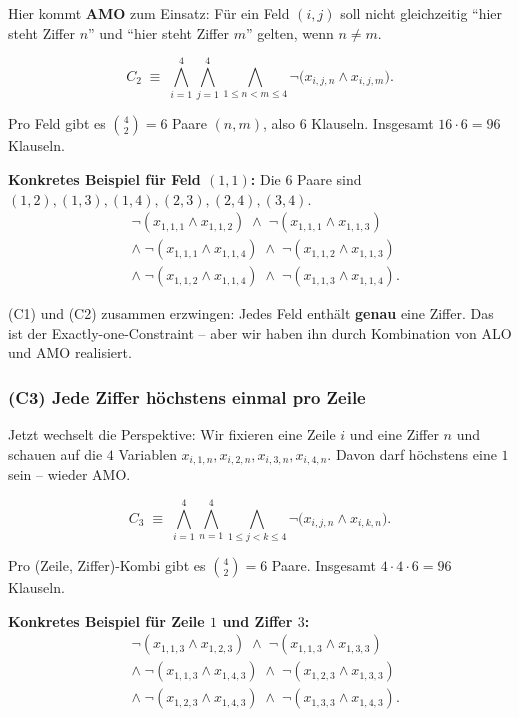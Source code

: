 \documentclass[a4paper,12pt]{article}
\begin{document}
Hier kommt \textbf{AMO} zum Einsatz: F\"ur ein Feld $(i,j)$ soll nicht
gleichzeitig "`hier steht Ziffer $n$"' und "`hier steht Ziffer $m$"'
gelten, wenn $n \ne m$.

\[
C_2 \;\equiv\;
\bigwedge_{i=1}^{4} \bigwedge_{j=1}^{4}
\bigwedge_{1 \le n < m \le 4}
\neg\bigl(x_{i,j,n} \wedge x_{i,j,m}\bigr).
\]

Pro Feld gibt es $\binom{4}{2} = 6$ Paare $(n,m)$, also $6$ Klauseln.
Insgesamt $16 \cdot 6 = 96$ Klauseln.

\textbf{Konkretes Beispiel f\"ur Feld $(1,1)$:} Die $6$ Paare sind
$(1,2), (1,3), (1,4), (2,3), (2,4), (3,4)$.
\begin{align*}
& \neg(x_{1,1,1} \wedge x_{1,1,2}) \;\wedge\; \neg(x_{1,1,1} \wedge x_{1,1,3}) \\
& \wedge\; \neg(x_{1,1,1} \wedge x_{1,1,4}) \;\wedge\; \neg(x_{1,1,2} \wedge x_{1,1,3}) \\
& \wedge\; \neg(x_{1,1,2} \wedge x_{1,1,4}) \;\wedge\; \neg(x_{1,1,3} \wedge x_{1,1,4}).
\end{align*}

\begin{merkbox}
(C1) und (C2) zusammen erzwingen: Jedes Feld enth\"alt \textbf{genau}
eine Ziffer. Das ist der Exactly-one-Constraint -- aber wir haben ihn
durch Kombination von ALO und AMO realisiert.
\end{merkbox}

\subsubsection*{(C3) Jede Ziffer h\"ochstens einmal pro Zeile}

Jetzt wechselt die Perspektive: Wir fixieren eine Zeile $i$ und eine
Ziffer $n$ und schauen auf die $4$ Variablen $x_{i,1,n}, x_{i,2,n},
x_{i,3,n}, x_{i,4,n}$. Davon darf h\"ochstens eine $1$ sein -- wieder
AMO.

\[
C_3 \;\equiv\;
\bigwedge_{i=1}^{4} \bigwedge_{n=1}^{4}
\bigwedge_{1 \le j < k \le 4}
\neg\bigl(x_{i,j,n} \wedge x_{i,k,n}\bigr).
\]

Pro (Zeile, Ziffer)-Kombi gibt es $\binom{4}{2} = 6$ Paare. Insgesamt
$4 \cdot 4 \cdot 6 = 96$ Klauseln.

\textbf{Konkretes Beispiel f\"ur Zeile $1$ und Ziffer $3$:}
\begin{align*}
& \neg(x_{1,1,3} \wedge x_{1,2,3}) \;\wedge\; \neg(x_{1,1,3} \wedge x_{1,3,3}) \\
& \wedge\; \neg(x_{1,1,3} \wedge x_{1,4,3}) \;\wedge\; \neg(x_{1,2,3} \wedge x_{1,3,3}) \\
& \wedge\; \neg(x_{1,2,3} \wedge x_{1,4,3}) \;\wedge\; \neg(x_{1,3,3} \wedge x_{1,4,3}).
\end{align*}
\end{document}

